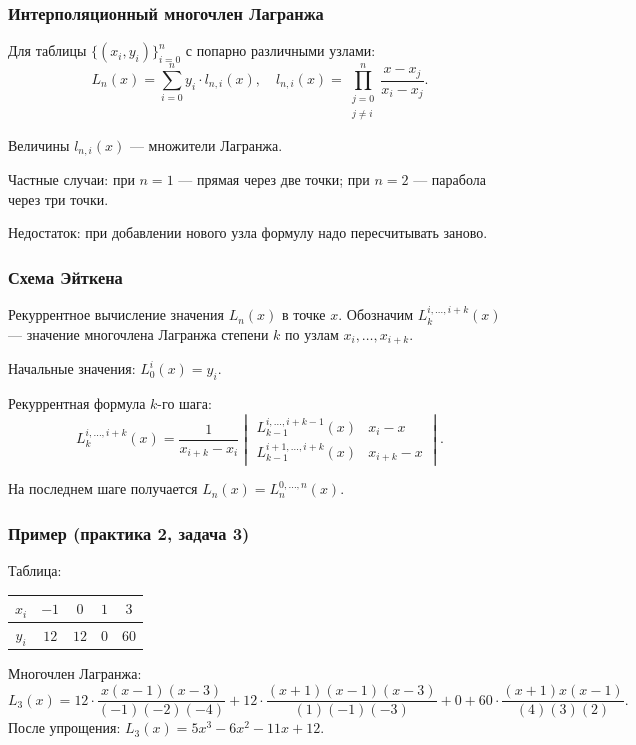 \subsubsection*{Интерполяционный многочлен Лагранжа}

Для таблицы $\{(x_i, y_i)\}_{i=0}^{n}$ с попарно различными узлами:
\[
    L_n(x) = \sum_{i=0}^{n} y_i \cdot l_{n,i}(x), \quad l_{n,i}(x) = \prod_{\substack{j=0\\j\neq i}}^{n} \frac{x - x_j}{x_i - x_j}.
\]

Величины $l_{n,i}(x)$ --- множители Лагранжа.

Частные случаи: при $n=1$ --- прямая через две точки; при $n=2$ --- парабола через три точки.

Недостаток: при добавлении нового узла формулу надо пересчитывать заново.

\subsubsection*{Схема Эйткена}

Рекуррентное вычисление значения $L_n(x)$ в точке $x$. Обозначим $L_k^{i,\ldots,i+k}(x)$ --- значение многочлена Лагранжа степени $k$ по узлам $x_i, \ldots, x_{i+k}$.

Начальные значения: $L_0^i(x) = y_i$.

Рекуррентная формула $k$-го шага:
\[
    L_k^{i,\ldots,i+k}(x) = \frac{1}{x_{i+k} - x_i}
    \begin{vmatrix}
        L_{k-1}^{i,\ldots,i+k-1}(x) & x_i - x \\
        L_{k-1}^{i+1,\ldots,i+k}(x) & x_{i+k} - x
    \end{vmatrix}.
\]

На последнем шаге получается $L_n(x) = L_n^{0,\ldots,n}(x)$.

\subsubsection*{Пример (практика 2, задача 3)}

Таблица:

\begin{center}
\begin{tabular}{c|cccc}
    $x_i$ & $-1$ & $0$ & $1$ & $3$ \\
    \hline
    $y_i$ & $12$ & $12$ & $0$ & $60$
\end{tabular}
\end{center}

Многочлен Лагранжа:
\[
    L_3(x) = 12 \cdot \frac{x(x-1)(x-3)}{(-1)(-2)(-4)} + 12 \cdot \frac{(x+1)(x-1)(x-3)}{(1)(-1)(-3)} + 0 + 60 \cdot \frac{(x+1)x(x-1)}{(4)(3)(2)}.
\]
После упрощения: $L_3(x) = 5x^3 - 6x^2 - 11x + 12$.


